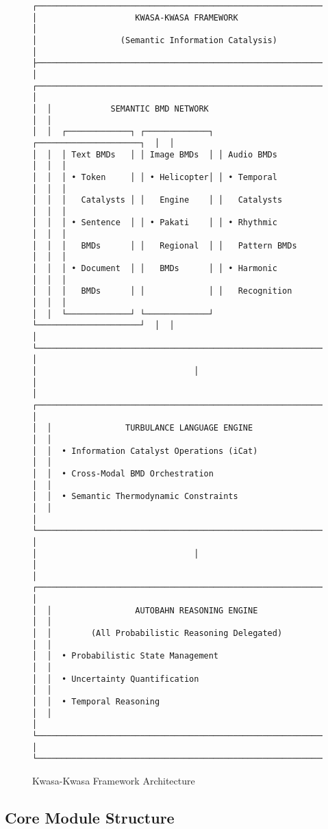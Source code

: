 \documentclass[12pt,a4paper,twoside]{article}
\begin{document}
\begin{itemize}
\begin{figure}[h]
\centering
\begin{verbatim}
┌─────────────────────────────────────────────────────────────────┐
│                    KWASA-KWASA FRAMEWORK                        │
│                 (Semantic Information Catalysis)               │
├─────────────────────────────────────────────────────────────────┤
│  ┌───────────────────────────────────────────────────────────┐  │
│  │            SEMANTIC BMD NETWORK                           │  │
│  │  ┌─────────────┐ ┌─────────────┐ ┌─────────────────────┐  │  │
│  │  │ Text BMDs   │ │ Image BMDs  │ │ Audio BMDs          │  │  │
│  │  │ • Token     │ │ • Helicopter│ │ • Temporal          │  │  │
│  │  │   Catalysts │ │   Engine    │ │   Catalysts         │  │  │
│  │  │ • Sentence  │ │ • Pakati    │ │ • Rhythmic          │  │  │
│  │  │   BMDs      │ │   Regional  │ │   Pattern BMDs      │  │  │
│  │  │ • Document  │ │   BMDs      │ │ • Harmonic          │  │  │
│  │  │   BMDs      │ │             │ │   Recognition       │  │  │
│  │  └─────────────┘ └─────────────┘ └─────────────────────┘  │  │
│  └───────────────────────────────────────────────────────────┘  │
│                                │                                │
│  ┌───────────────────────────────────────────────────────────┐  │
│  │               TURBULANCE LANGUAGE ENGINE                  │  │
│  │  • Information Catalyst Operations (iCat)                │  │
│  │  • Cross-Modal BMD Orchestration                          │  │
│  │  • Semantic Thermodynamic Constraints                    │  │
│  └───────────────────────────────────────────────────────────┘  │
│                                │                                │
│  ┌───────────────────────────────────────────────────────────┐  │
│  │                 AUTOBAHN REASONING ENGINE                 │  │
│  │        (All Probabilistic Reasoning Delegated)           │  │
│  │  • Probabilistic State Management                        │  │
│  │  • Uncertainty Quantification                            │  │
│  │  • Temporal Reasoning                                     │  │
│  └───────────────────────────────────────────────────────────┘  │
└─────────────────────────────────────────────────────────────────┘
\end{verbatim}
\caption{Kwasa-Kwasa Framework Architecture}
\end{figure}

\subsection{Core Module Structure}


\end{itemize}
\end{document}

